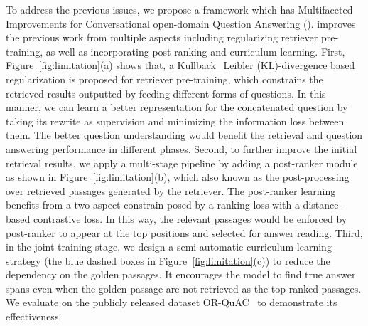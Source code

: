To address the previous issues, we propose a framework which has Multifaceted Improvements for Conversational open-domain Question Answering ({\modelname}). {\modelname} improves the previous work from multiple aspects including regularizing retriever pre-training, as well as incorporating post-ranking and curriculum learning.
First, Figure~\ref{fig:limitation}(a) shows that, a Kullback\_Leibler (KL)-divergence based regularization is proposed for retriever pre-training, which constrains the retrieved results outputted by feeding different forms of questions. In this manner, we can learn a better representation for the concatenated question by taking its rewrite as supervision and minimizing the information loss between them. The better question understanding would benefit the retrieval and question answering performance in different phases.
Second, 
to further improve the initial retrieval results, we apply a multi-stage pipeline by adding a post-ranker module as shown in Figure~\ref{fig:limitation}(b), which also known as the post-processing~\cite{zhu2021retrieving} over retrieved passages generated by the retriever. The post-ranker learning benefits from a two-aspect constrain posed by a ranking loss with a distance-based contrastive loss. In this way, the relevant passages would be enforced by post-ranker to appear at the top positions and selected for answer reading.
Third, in the joint training stage, we design a semi-automatic curriculum learning strategy (the blue dashed boxes in Figure~\ref{fig:limitation}(c)) to reduce the dependency on the golden passages. It encourages the model to find true answer spans even when the golden passage are not retrieved as the top-ranked passages.
We evaluate {\modelname} on the publicly released dataset OR-QuAC~\cite{qu2020open} to demonstrate its effectiveness.

